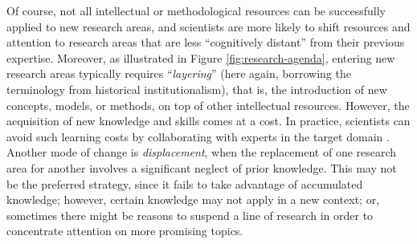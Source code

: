 \documentclass{article}
\begin{document}
Of course, not all intellectual or methodological resources can be successfully applied to new research areas, and scientists are more likely to shift resources and attention to research areas that are less ``cognitively distant'' from their previous expertise. Moreover, as illustrated in Figure \ref{fig:research-agenda}, entering new research areas typically requires ``\textit{layering}'' (here again, borrowing the terminology from historical institutionalism), that is, the introduction of new concepts, models, or methods, on top of other intellectual resources. However, the acquisition of new knowledge and skills comes at a cost. In practice, scientists can avoid such learning costs by collaborating with experts in the target domain \citep{Tripodi2020}. Another mode of change is \textit{displacement}, when the replacement of one research area for another involves a significant neglect of prior knowledge. %
This may not be the preferred strategy, since it fails to take advantage of accumulated knowledge; however, certain knowledge may not apply in a new context; or, sometimes there might be reasons to suspend a line of research in order to concentrate attention on more promising topics. 
\end{document}
